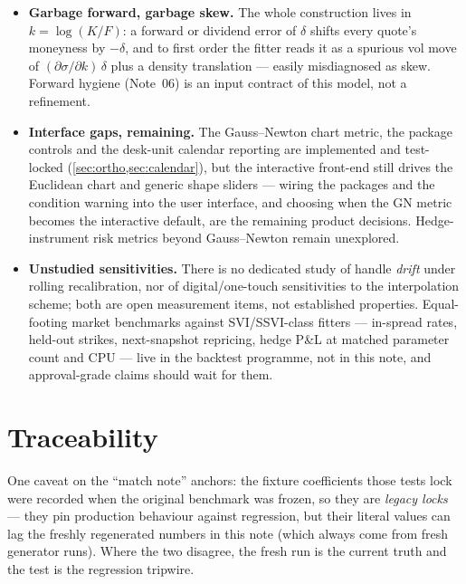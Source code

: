 \documentclass[11pt]{article}
\begin{document}
\begin{itemize}[leftmargin=1.4em]
nothing in this note prices them.
\item \textbf{Garbage forward, garbage skew.}  The whole construction lives
in $k=\log(K/F)$: a forward or dividend error of $\delta$ shifts every
quote's moneyness by $-\delta$, and to first order the fitter reads it as a
spurious vol move of $(\partial\sigma/\partial k)\,\delta$ plus a density
translation --- easily misdiagnosed as skew.  Forward hygiene (Note~06) is
an input contract of this model, not a refinement.
\item \textbf{Interface gaps, remaining.}  The Gauss--Newton chart metric,
the package controls and the desk-unit calendar reporting are implemented
and test-locked (\cref{sec:ortho,sec:calendar}), but the interactive
front-end still drives the Euclidean chart and generic shape sliders ---
wiring the packages and the condition warning into the user interface, and
choosing when the GN metric becomes the interactive default, are the
remaining product decisions.  Hedge-instrument risk metrics beyond
Gauss--Newton remain unexplored.
\item \textbf{Unstudied sensitivities.}  There is no dedicated study of
handle \emph{drift} under rolling recalibration, nor of digital/one-touch
sensitivities to the interpolation scheme; both are open measurement items,
not established properties.  Equal-footing market benchmarks against
SVI/SSVI-class fitters --- in-spread rates, held-out strikes, next-snapshot
repricing, hedge P\&L at matched parameter count and CPU --- live in the
backtest programme, not in this note, and approval-grade claims should wait
for them.
\end{itemize}

\section{Traceability}
\label{sec:traceability}

One caveat on the ``match note'' anchors: the fixture coefficients those
tests lock were recorded when the original benchmark was frozen, so they are
\emph{legacy locks} --- they pin production behaviour against regression,
but their literal values can lag the freshly regenerated numbers in this
note (which always come from fresh generator runs).  Where the two disagree,
the fresh run is the current truth and the test is the regression tripwire.
\end{document}

